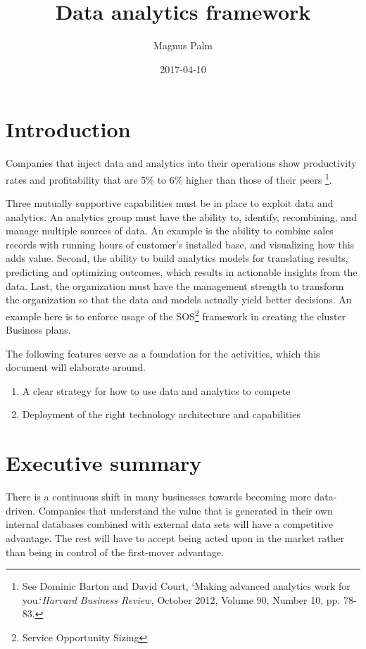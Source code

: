 \documentclass[10pt]{article} %
\title{Data analytics framework}
\author{Magnus Palm}
\date{2017-04-10} %
\begin{document}
\maketitle

\section*{Introduction}
Companies that inject data and analytics into their operations show productivity rates and profitability that are 5\% to 6\% higher than those of their peers \footnote{See Dominic Barton and David Court, `Making advanced analytics work for you.`\textit{Harvard Business Review,} October 2012, Volume 90, Number 10, pp. 78-83.}.

Three mutually supportive capabilities must be in place to exploit data and analytics. An analytics group must have the ability to, identify, recombining, and manage multiple sources of data. An example is the ability to combine sales records with running hours of customer's installed base, and visualizing how this adds value. Second, the ability to build analytics models for translating results, predicting and optimizing outcomes, which results in actionable insights from the data. Last, the organization must have the management strength to transform the organization so that the data and models actually yield better decisions. An example here is to enforce usage of the SOS\footnote{Service Opportunity Sizing} framework in creating the cluster Business plans.

The following features serve as a foundation for the activities, which this document will elaborate around.


\begin{enumerate}
\item A clear strategy for how to use data and analytics to compete
\item Deployment of the right technology architecture and capabilities
\end{enumerate}


\tableofcontents
\listoffigures
\listoftables

\section{Executive summary}

There is a continuous shift in many businesses towards becoming more data-driven. Companies that understand the value that is generated in their own internal databases combined with external data sets will have a competitive advantage. The rest will have to accept being acted upon in the market rather than being in control of the first-mover advantage.
\end{document}
